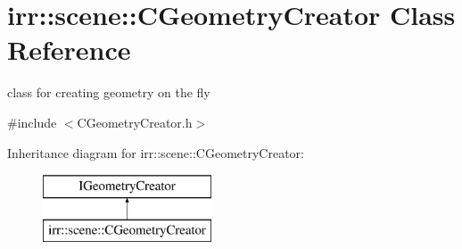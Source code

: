 \hypertarget{classirr_1_1scene_1_1_c_geometry_creator}{\section{irr\-:\-:scene\-:\-:C\-Geometry\-Creator Class Reference}
\label{classirr_1_1scene_1_1_c_geometry_creator}
}


class for creating geometry on the fly  




{\ttfamily \#include $<$C\-Geometry\-Creator.\-h$>$}

Inheritance diagram for irr\-:\-:scene\-:\-:C\-Geometry\-Creator\-:\begin{figure}[H]
\begin{center}
\leavevmode
\includegraphics[height=2.000000cm]{classirr_1_1scene_1_1_c_geometry_creator}
\end{center}
\end{figure}
